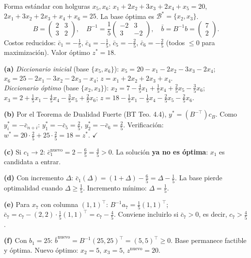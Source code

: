\documentclass[12pt]{article}
\theoremstyle{plain}
\begin{document}
\begin{solucion}

Forma estándar con holguras $x_5, x_6$: $x_1+2x_2+3x_3+2x_4+x_5=20$, $2x_1+3x_2+2x_3+x_4+x_6=25$. La base óptima es $\mathcal{B}^*=\{x_2,x_3\}$.
\[
B = \begin{pmatrix}2&3\\3&2\end{pmatrix},\quad B^{-1}=\frac{1}{5}\begin{pmatrix}-2&3\\3&-2\end{pmatrix},\quad \bar{b}=B^{-1}b=\begin{pmatrix}7\\2\end{pmatrix}.
\]
Costos reducidos: $\bar{c}_1=-\tfrac{1}{5}$, $\bar{c}_4=-\tfrac{1}{5}$, $\bar{c}_5=-\tfrac{2}{5}$, $\bar{c}_6=-\tfrac{2}{5}$ (todos $\leq 0$ para maximización). Valor óptimo $z^*=18$.

\noindent\textbf{(a)} \textit{Diccionario inicial} (base $\{x_5,x_6\}$): $x_5=20-x_1-2x_2-3x_3-2x_4$; $x_6=25-2x_1-3x_2-2x_3-x_4$; $z=x_1+2x_2+2x_3+x_4$.\\ \textit{Diccionario óptimo} (base $\{x_2,x_3\}$): $x_2=7-\tfrac{4}{5}x_1+\tfrac{1}{5}x_4+\tfrac{2}{5}x_5-\tfrac{3}{5}x_6$; $x_3=2+\tfrac{1}{5}x_1-\tfrac{4}{5}x_4-\tfrac{3}{5}x_5+\tfrac{2}{5}x_6$; $z=18-\tfrac{1}{5}x_1-\tfrac{1}{5}x_4-\tfrac{2}{5}x_5-\tfrac{2}{5}x_6$.

\noindent\textbf{(b)} Por el Teorema de Dualidad Fuerte (BT Teo. 4.4), $y^*=(B^{-\top})c_B$. Como $y_i^* = -\bar{c}_{n+i}$: $y_1^*=-\bar{c}_5=\tfrac{2}{5}$, $y_2^*=-\bar{c}_6=\tfrac{2}{5}$. Verificación: $w^*=20\cdot\tfrac{2}{5}+25\cdot\tfrac{2}{5}=18=z^*$. $\checkmark$

\noindent\textbf{(c)} Si $c_1\to 2$: $\bar{c}_1^{\text{nuevo}}=2-\tfrac{6}{5}=\tfrac{4}{5}>0$. La solución \textbf{ya no es óptima}: $x_1$ es candidata a entrar.

\noindent\textbf{(d)} Con incremento $\Delta$: $\bar{c}_1(\Delta)=(1+\Delta)-\tfrac{6}{5}=\Delta-\tfrac{1}{5}$. La base pierde optimalidad cuando $\Delta\geq\tfrac{1}{5}$. Incremento mínimo: $\boxed{\Delta=\tfrac{1}{5}}$.

\noindent\textbf{(e)} Para $x_7$ con columna $(1,1)^\top$: $B^{-1}a_7=\tfrac{1}{5}(1,1)^\top$; $\bar{c}_7=c_7-(2,2)\cdot\tfrac{1}{5}(1,1)^\top=c_7-\tfrac{4}{5}$. Conviene incluirlo si $\bar{c}_7>0$, es decir, $c_7>\tfrac{4}{5}$.

\noindent\textbf{(f)} Con $b_1=25$: $\bar{b}^{\text{nuevo}}=B^{-1}(25,25)^\top=(5,5)^\top\geq 0$. Base permanece factible y óptima. Nuevo óptimo: $x_2=5$, $x_3=5$, $z^{\text{nuevo}}=20$.


\end{solucion}
\end{document}
